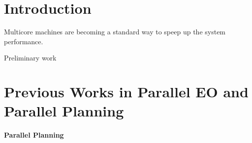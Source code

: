 \documentclass{sig-alternate}
\begin{document}
\section{Introduction}
Multicore machines are becoming a standard way to speep up the system performance.


Preliminary work


\section{Previous Works in Parallel EO and Parallel Planning}

\paragraph{Parallel Planning} %
\label{section:previous-work}
\end{document}
